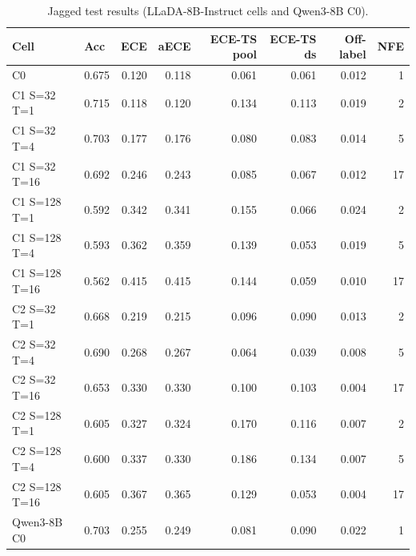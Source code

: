 \begin{table}[h!]
\centering
\small
\caption{Jagged test results (LLaDA-8B-Instruct cells and Qwen3-8B C0).}
\label{tab:main_jagged}
\begin{tabular}{llrrrrrr}
\toprule
Cell & Acc & ECE & aECE & ECE-TS pool & ECE-TS ds & Off-label & NFE \\
\midrule
C0 & 0.675 & 0.120 & 0.118 & 0.061 & 0.061 & 0.012 & 1 \\
C1 S=32 T=1 & 0.715 & 0.118 & 0.120 & 0.134 & 0.113 & 0.019 & 2 \\
C1 S=32 T=4 & 0.703 & 0.177 & 0.176 & 0.080 & 0.083 & 0.014 & 5 \\
C1 S=32 T=16 & 0.692 & 0.246 & 0.243 & 0.085 & 0.067 & 0.012 & 17 \\
C1 S=128 T=1 & 0.592 & 0.342 & 0.341 & 0.155 & 0.066 & 0.024 & 2 \\
C1 S=128 T=4 & 0.593 & 0.362 & 0.359 & 0.139 & 0.053 & 0.019 & 5 \\
C1 S=128 T=16 & 0.562 & 0.415 & 0.415 & 0.144 & 0.059 & 0.010 & 17 \\
C2 S=32 T=1 & 0.668 & 0.219 & 0.215 & 0.096 & 0.090 & 0.013 & 2 \\
C2 S=32 T=4 & 0.690 & 0.268 & 0.267 & 0.064 & 0.039 & 0.008 & 5 \\
C2 S=32 T=16 & 0.653 & 0.330 & 0.330 & 0.100 & 0.103 & 0.004 & 17 \\
C2 S=128 T=1 & 0.605 & 0.327 & 0.324 & 0.170 & 0.116 & 0.007 & 2 \\
C2 S=128 T=4 & 0.600 & 0.337 & 0.330 & 0.186 & 0.134 & 0.007 & 5 \\
C2 S=128 T=16 & 0.605 & 0.367 & 0.365 & 0.129 & 0.053 & 0.004 & 17 \\
Qwen3-8B C0 & 0.703 & 0.255 & 0.249 & 0.081 & 0.090 & 0.022 & 1 \\
\bottomrule
\end{tabular}
\end{table}
